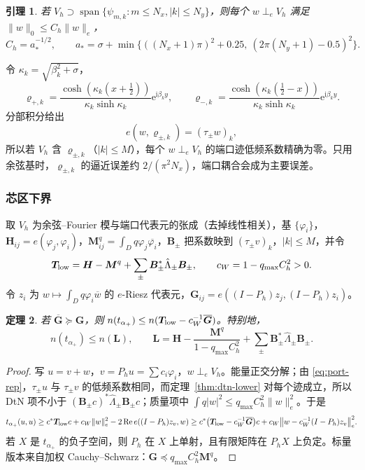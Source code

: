 \documentclass[11pt,a4paper,fontset=fandol]{ctexart}
\newcommand{\ii}{\mathrm{i}}
\newcommand{\ee}{\mathrm{e}}
\theoremstyle{plain}
\newtheorem{theorem}{定理}[section]
\newtheorem{lemma}[theorem]{引理}
\theoremstyle{definition}
\theoremstyle{remark}
\begin{document}
\begin{lemma}
\label{lem:proj-const}
若 $V_h\supset\operatorname{span}\{\psi_{m,k}:m\le N_x,|k|\le N_y\}$，则每个 $w\perp_eV_h$ 满足 $\|w\|_0\le C_h\|w\|_e$，
\[
C_h=a_*^{-1/2},\qquad a_*=\sigma+\min\bigl\{((N_x+1)\pi)^2+0.25,\ (2\pi(N_y+1)-0.5)^2\bigr\}.
\]
\end{lemma}

令 $\kappa_k=\sqrt{\beta_k^2+\sigma}$，
\[
\varrho_{+,k}=\frac{\cosh(\kappa_k(x+\frac12))}{\kappa_k\sinh\kappa_k}\ee^{\ii\beta_ky},\qquad\varrho_{-,k}=\frac{\cosh(\kappa_k(\frac12-x))}{\kappa_k\sinh\kappa_k}\ee^{\ii\beta_ky}.
\]
分部积分给出
\begin{equation}
\label{eq:port-rep}
e(w,\varrho_{\pm,k})=(\tau_\pm w)_k ,
\end{equation}
所以若 $V_h$ 含 $\varrho_{\pm,k}$（$|k|\le M$），每个 $w\perp_eV_h$ 的端口迹低频系数精确为零。只用余弦基时，$\varrho_{\pm,k}$ 的逼近误差约 $2/(\pi^2N_x)$，端口耦合会成为主要误差。

\subsubsection{芯区下界}

取 $V_h$ 为余弦--Fourier 模与端口代表元的张成（去掉线性相关），基 $\{\varphi_i\}$，$\bm H_{ij}=e(\varphi_j,\varphi_i)$，$\bm M^q_{ij}=\int_Dq\varphi_j\overline{\varphi_i}$，$\bm B_\pm$ 把系数映到 $(\tau_\pm v)_k$，$|k|\le M$，并令
\[
\bm T_{\rm low}=\bm H-\bm M^q+\sum_\pm\bm B_\pm^*\hat\Lambda_\pm\bm B_\pm,\qquad c_W=1-q_{\max}C_h^2>0 .
\]
令 $z_i$ 为 $w\mapsto\int_Dq\varphi_i\overline w$ 的 $e$-Riesz 代表元，$\bm G_{ij}=e((I-P_h)z_j,(I-P_h)z_i)$。

\begin{theorem}
\label{thm:core-lower}
若 $\overline{\bm G}\succeq\bm G$，则 $n(t_{\alpha_+})\le n(\bm T_{\rm low}-c_W^{-1}\overline{\bm G})$。特别地，
\begin{equation}
\label{eq:L-scalar}
n(t_{\alpha_+})\le n(\bm L),\qquad\bm L=\bm H-\frac{\bm M^q}{1-q_{\max}C_h^2}+\sum_\pm\bm B_\pm^*\hat\Lambda_\pm\bm B_\pm .
\end{equation}
\end{theorem}

\begin{proof}
写 $u=v+w$，$v=P_hu=\sum c_i\varphi_i$，$w\perp_eV_h$。能量正交分解；由 \eqref{eq:port-rep}，$\tau_\pm u$ 与 $\tau_\pm v$ 的低频系数相同，而定理~\ref{thm:dtn-lower} 对每个迹成立，所以 DtN 项不小于 $(\bm B_\pm c)^*\hat\Lambda_\pm\bm B_\pm c$；质量项中 $\int q|w|^2\le q_{\max}C_h^2\|w\|_e^2$。于是
\[
t_{\alpha_+}(u,u)\ge c^*\bm T_{\rm low}c+c_W\|w\|_e^2-2\operatorname{Re}e((I-P_h)z_v,w)\ge c^*\bigl(\bm T_{\rm low}-c_W^{-1}\overline{\bm G}\bigr)c+c_W\bigl\|w-c_W^{-1}(I-P_h)z_v\bigr\|_e^2 .
\]
若 $X$ 是 $t_{\alpha_+}$ 的负子空间，则 $P_h$ 在 $X$ 上单射，且有限矩阵在 $P_hX$ 上负定。标量版本来自加权 Cauchy--Schwarz：$\bm G\preceq q_{\max}C_h^2\bm M^q$。
\end{proof}
\end{document}
